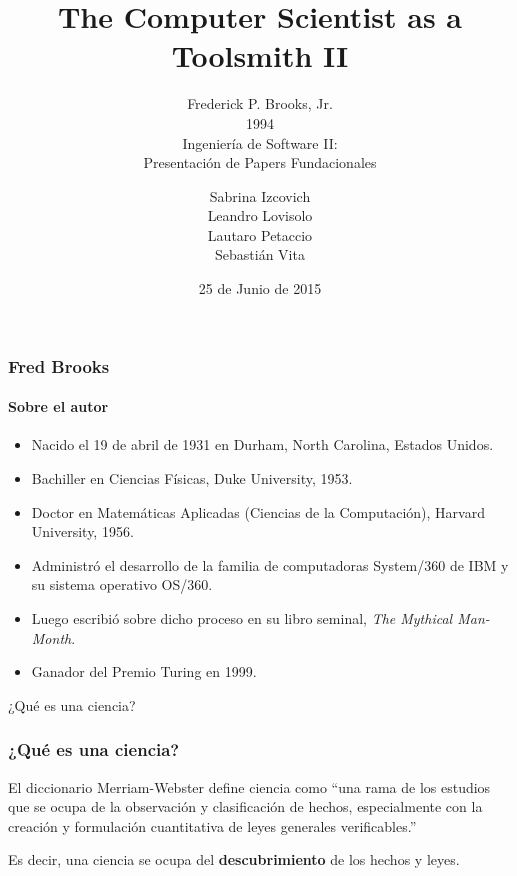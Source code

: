 \documentclass[spanish]{beamer}
\title{The Computer Scientist as a Toolsmith II}
\subtitle{
  Frederick P. Brooks, Jr. \\
  1994 \\
  \vspace{2em}
  Ingeniería de Software II: \\
  Presentación de Papers Fundacionales
}
\author{
  Sabrina Izcovich \\
  Leandro Lovisolo \\
  Lautaro Petaccio \\
  Sebastián Vita
}
\date{25 de Junio de 2015}
\institute{
  Departamento de Computación \\
  Facultad de Ciencias Exactas y Naturales \\
  Universidad de Buenos Aires
}
\begin{document}
\begin{frame}
  \titlepage
\end{frame}

\begin{frame}
  \frametitle{Fred Brooks}
  \framesubtitle{Sobre el autor}

  \pause

  \begin{itemize}
    \item Nacido el 19 de abril de 1931 en Durham, North Carolina, Estados
      Unidos.

    \pause

    \item Bachiller en Ciencias Físicas, Duke University, 1953.

    \pause

  \item Doctor en Matemáticas Aplicadas (Ciencias de la Computación), Harvard
      University, 1956.

    \pause

    \item Administró el desarrollo de la familia de computadoras System/360 de
      IBM y su sistema operativo OS/360.

    \pause

    \item Luego escribió sobre dicho proceso en su libro seminal, \textit{The
      Mythical Man-Month}.

    \pause

    \item Ganador del Premio Turing en 1999.
  \end{itemize}
\end{frame}

\begin{frame}
  \begin{center}
    \Huge{
      ¿Qué es una ciencia?
    }
  \end{center}
\end{frame}

\begin{frame}
  \frametitle{¿Qué es una ciencia?}

  El diccionario Merriam-Webster define ciencia como ``una rama de los estudios
  que se ocupa de la observación y clasificación de hechos, especialmente con
  la creación y formulación cuantitativa de leyes generales verificables.''

  \pause

  \vspace{2em}
  Es decir, una ciencia se ocupa del \textbf{descubrimiento} de los hechos y
  leyes.
\end{frame}
\end{document}
